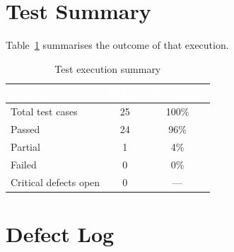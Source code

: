 \documentclass[12pt,a4paper,oneside]{report}
\begin{document}
\section{Test Summary}

Table~\ref{tab:testsum} summarises the outcome of that execution.

\begin{table}[H]
\centering
\caption{Test execution summary}
\label{tab:testsum}
\small
\begin{tabular}{@{}lcc@{}}
\toprule
\rowcolor{tblhead} \textcolor{white}{\textbf{Metric}} & \textcolor{white}{\textbf{Count}} & \textcolor{white}{\textbf{Percentage}} \\
\midrule
Total test cases      & 25 & 100\% \\
Passed                & 24 & 96\% \\
Partial               & 1  & 4\% \\
Failed                & 0  & 0\% \\
Critical defects open & 0  & --- \\
\bottomrule
\end{tabular}
\end{table}

\section{Defect Log}
\end{document}
